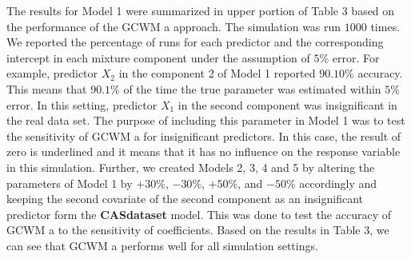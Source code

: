 \documentclass[11pt,letterpaper]{article}
\numberwithin{equation}{section}
\numberwithin{equation}{section}
\numberwithin{equation}{section}
\begin{document}
The results for Model 1 were summarized in upper portion of Table 3 based on the performance of the  GCWM a approach. The simulation was run $1000$ times. We reported the percentage of runs for each predictor and the corresponding intercept in each mixture component under the assumption of $5\%$ error. For example, predictor $X_2$ in the component 2 of Model 1 reported $90.10\%$ accuracy. This means that $90.1\%$ of the time the true parameter was estimated within $5\%$ error. In this setting, predictor $X_1$ in the second component was insignificant in the real data set. The purpose of including this parameter in Model 1 was to test the sensitivity of  GCWM a for insignificant predictors. In this case, the result of zero is underlined and it means that it has no influence on the response variable in this simulation. Further, we created Models 2, 3, 4 and 5 by altering the parameters of Model 1 by $+30\%$, $-30\%$, $+50\%$, and $-50\%$ accordingly and keeping the second covariate of the second component as an insignificant predictor form the \textbf{CASdataset} model. This was done to test the accuracy of  GCWM a to the  sensitivity of coefficients. Based on the results in Table 3, we can see that  GCWM a performs well for all simulation settings.
\end{document}
